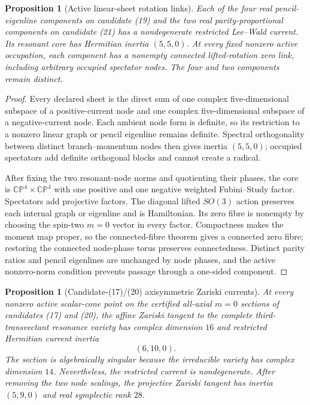 \documentclass[11pt]{article}
\newtheorem{proposition}[theorem]{Proposition}
\theoremstyle{definition}
\theoremstyle{remark}
\begin{document}
\begin{proposition}[Active linear-sheet rotation links]
Each of the four real pencil-eigenline components on candidate (19) and the
two real parity-proportional components on candidate (21) has a nondegenerate
restricted Lee--Wald current.  Its resonant core has Hermitian inertia
\((5,5,0)\).  At every fixed nonzero active occupation, each component has a
nonempty connected lifted-rotation zero link, including arbitrary occupied
spectator nodes.  The four and two components remain distinct.
\end{proposition}

\begin{proof}
Every declared sheet is the direct sum of one complex five-dimensional
subspace of a positive-current node and one complex five-dimensional
subspace of a negative-current node.  Each ambient node form is definite,
so its restriction to a nonzero linear graph or pencil eigenline remains
definite.  Spectral orthogonality between distinct branch--momentum nodes
then gives inertia \((5,5,0)\); occupied spectators add definite orthogonal
blocks and cannot create a radical.

After fixing the two resonant-node norms and quotienting their phases, the
core is \(\mathbb{CP}^4\times\mathbb{CP}^4\) with one positive and one
negative weighted Fubini--Study factor.  Spectators add projective factors.
The diagonal lifted \(SO(3)\) action preserves each internal graph or
eigenline and is Hamiltonian.  Its zero fibre is nonempty by choosing the
spin-two \(m=0\) vector in every factor.  Compactness makes the moment map
proper, so the connected-fibre theorem gives a connected zero fibre;
restoring the connected node-phase torus preserves connectedness.  Distinct
parity ratios and pencil eigenlines are unchanged by node phases, and the
active nonzero-norm condition prevents passage through a one-sided component.
\end{proof}

\begin{proposition}[Candidate-(17)/(20) axisymmetric Zariski currents]
At every nonzero active scalar-cone point on the certified all-axial
\(m=0\) sections of candidates (17) and (20), the affine Zariski tangent to
the complete third-transvectant resonance variety has complex dimension
\(16\) and restricted Hermitian current inertia
\[
 (6,10,0).
\]
The section is algebraically singular because the irreducible variety has
complex dimension \(14\).  Nevertheless, the restricted current is
nondegenerate.  After removing the two node scalings, the projective Zariski
tangent has inertia \((5,9,0)\) and real symplectic rank \(28\).
\end{proposition}
\end{document}
